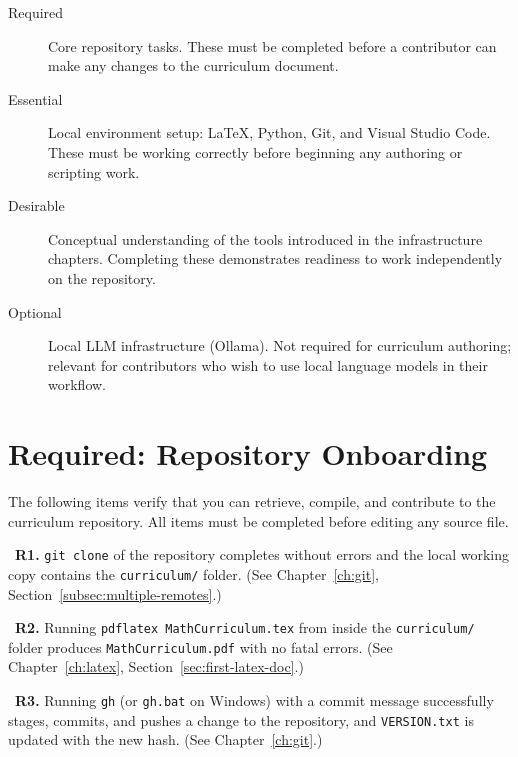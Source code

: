 \begin{Form}
\begin{description}
    \item[Required] Core repository tasks. These must be completed
          before a contributor can make any changes to the curriculum
          document.
    \item[Essential] Local environment setup: \LaTeX{}, Python, Git,
          and Visual Studio Code. These must be working correctly
          before beginning any authoring or scripting work.
    \item[Desirable] Conceptual understanding of the tools introduced
          in the infrastructure chapters. Completing these
          demonstrates readiness to work independently on the
          repository.
    \item[Optional] Local LLM infrastructure (Ollama). Not required
          for curriculum authoring; relevant for contributors who
          wish to use local language models in their workflow.
\end{description}
\vs

\section{Required: Repository Onboarding}
\label{sec:assess-required}

The following items verify that you can retrieve, compile, and
contribute to the curriculum repository. All items must be
completed before editing any source file.

\vs

\noindent\CheckBox[name=r1,width=0.4cm,height=0.4cm]{}~\textbf{R1.}
\texttt{git clone} of the repository completes without errors and
the local working copy contains the \texttt{curriculum/} folder.
(See Chapter~\ref{ch:git}, Section~\ref{subsec:multiple-remotes}.)

\vs

\noindent\CheckBox[name=r2,width=0.4cm,height=0.4cm]{}~\textbf{R2.}
Running \texttt{pdflatex MathCurriculum.tex} from inside the
\texttt{curriculum/} folder produces \texttt{MathCurriculum.pdf}
with no fatal errors.
(See Chapter~\ref{ch:latex}, Section~\ref{sec:first-latex-doc}.)

\vs

\noindent\CheckBox[name=r3,width=0.4cm,height=0.4cm]{}~\textbf{R3.}
Running \texttt{gh} (or \texttt{gh.bat} on Windows) with a commit
message successfully stages, commits, and pushes a change to the
repository, and \texttt{VERSION.txt} is updated with the new hash.
(See Chapter~\ref{ch:git}.)


\end{Form}
